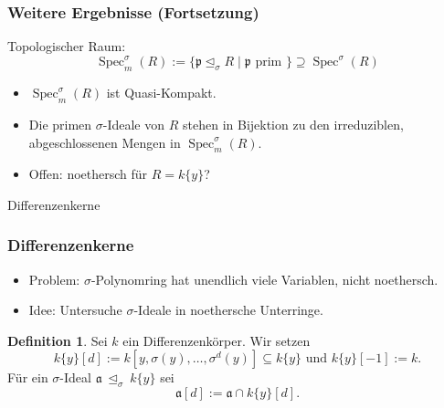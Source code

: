 \documentclass{beamer}
\def\a{\mathfrak{a}}
\def\p{\mathfrak{p}}
\def\s{\sigma}
\def\si{\unlhd_{\sigma}}
\def\Spec{\operatorname{Spec}}
\def\sSpec{\operatorname{Spec}^\sigma_m}
\newcommand{\catname}[1]{{\normalfont\textbf{#1}}}
\newcommand{\sringk}{\s\text{\catname{-ring}}_k}
\theoremstyle{definition}
\newtheorem{prop}[satz]{Proposition}
\newtheorem{defn}[satz]{Definition}
\begin{document}
\begin{frame}\frametitle{Weitere Ergebnisse (Fortsetzung)}
Topologischer Raum: $$\sSpec(R):= \{ \p \si R \mid \p \text{ prim }\} \supseteq \Spec^\s(R)$$

\begin{itemize}
\item $\sSpec(R)$ ist Quasi-Kompakt.
\item Die primen $\s$-Ideale von $R$ stehen in Bijektion zu den irreduziblen, abgeschlossenen Mengen in $\sSpec(R)$.
\item Offen: noethersch für $R = k\{y\}$? 
\end{itemize}
\end{frame}


\begin{frame}
\begin{center}
\LARGE Differenzenkerne
\end{center}
\end{frame}

\begin{frame}\frametitle{Differenzenkerne}
\begin{itemize}
\item Problem: $\s$-Polynomring hat unendlich viele Variablen, nicht noethersch. 
\item Idee: Untersuche $\s$-Ideale in noethersche Unterringe.
\end{itemize}
\begin{defn}
Sei $k$ ein Differenzenkörper. Wir setzen $$k\{y\}[d]:= k[y,\s(y),\ldots,\s^d(y)] \subseteq k\{y\} \text{ und }k\{y\}[-1] := k.$$
 Für ein $\s$-Ideal $\a~\si~k\{y\}$ sei $$\a[d] := \a \cap k\{y\}[d].$$
\end{defn}
\end{frame}
\end{document}
